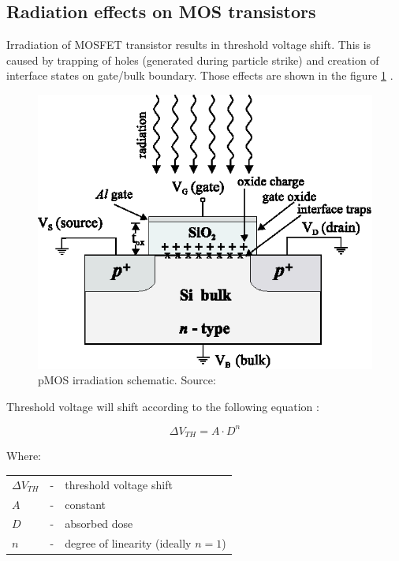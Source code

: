     \subsection{Radiation effects on MOS transistors}
    \label{Radiation_effects_on_MOS_transistors}
        Irradiation of MOSFET transistor results in threshold voltage shift. This is caused by trapping of holes (generated during particle strike) and creation of interface states on gate/bulk boundary. Those effects are shown in the figure \ref{MOS_irradiation} \cite{pMOS_dosimeters_radfets}.

        \begin{figure}[H]
            \centering
            \includegraphics[width=0.4\paperwidth]{img/03/MOS_irradiation_schematic.eps}
            \caption{pMOS irradiation schematic. Source: \cite{pMOS_dosimeters_radfets}}
            \label{MOS_irradiation}
        \end{figure}

        Threshold voltage will shift according to the following equation \cite{pMOS_dosimeters_radfets}:

        $$\Delta V_{TH} = A \cdot D^n$$

        Where:

        \begin{tabular}{lcl}
            $\Delta V_{TH}$ & - & threshold voltage shift \\
            $A$ & - & constant \\
            $D$ & - & absorbed dose \\
            $n$ & - & degree of linearity (ideally $n = 1$) \\
        \end{tabular}
        \bigskip



